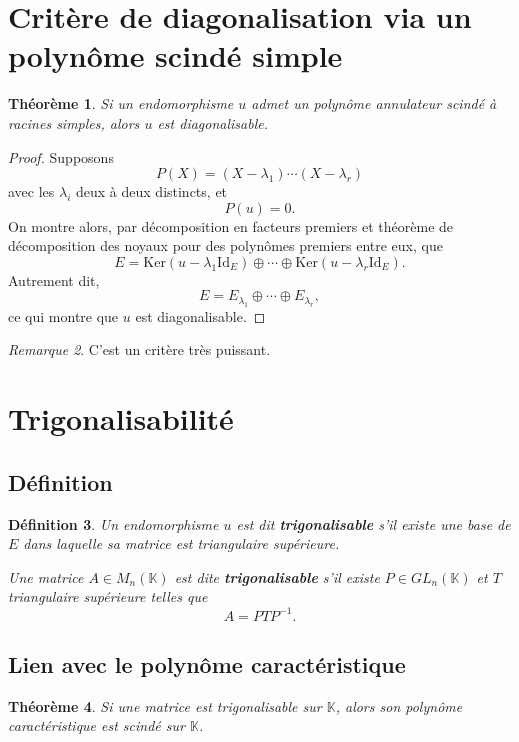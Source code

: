 \documentclass[11pt,a4paper]{article}
\newtheorem{definition}{Définition}[section]
\newtheorem{theoreme}[definition]{Théorème}
\theoremstyle{remark}
\newtheorem{remarque}[definition]{Remarque}
\newcommand{\K}{\mathbb{K}}
\newcommand{\Ker}{\mathrm{Ker}}
\newcommand{\id}{\mathrm{Id}}
\begin{document}
\section{Critère de diagonalisation via un polynôme scindé simple}

\begin{theoreme}
Si un endomorphisme \(u\) admet un polynôme annulateur scindé à racines simples, alors \(u\) est diagonalisable.
\end{theoreme}

\begin{proof}
Supposons
\[
P(X)=(X-\lambda_1)\cdots(X-\lambda_r)
\]
avec les \(\lambda_i\) deux à deux distincts, et
\[
P(u)=0.
\]
On montre alors, par décomposition en facteurs premiers et théorème de décomposition des noyaux pour des polynômes premiers entre eux, que
\[
E=\Ker(u-\lambda_1\id_E)\oplus\cdots\oplus\Ker(u-\lambda_r\id_E).
\]
Autrement dit,
\[
E=E_{\lambda_1}\oplus\cdots\oplus E_{\lambda_r},
\]
ce qui montre que \(u\) est diagonalisable.
\end{proof}

\begin{remarque}
C’est un critère très puissant.
\end{remarque}

\section{Trigonalisabilité}

\subsection{Définition}

\begin{definition}
Un endomorphisme \(u\) est dit \textbf{trigonalisable} s’il existe une base de \(E\) dans laquelle sa matrice est triangulaire supérieure.

Une matrice \(A\in M_n(\K)\) est dite \textbf{trigonalisable} s’il existe \(P\in GL_n(\K)\) et \(T\) triangulaire supérieure telles que
\[
A=PTP^{-1}.
\]
\end{definition}

\subsection{Lien avec le polynôme caractéristique}

\begin{theoreme}
Si une matrice est trigonalisable sur \(\K\), alors son polynôme caractéristique est scindé sur \(\K\).
\end{theoreme}
\end{document}
